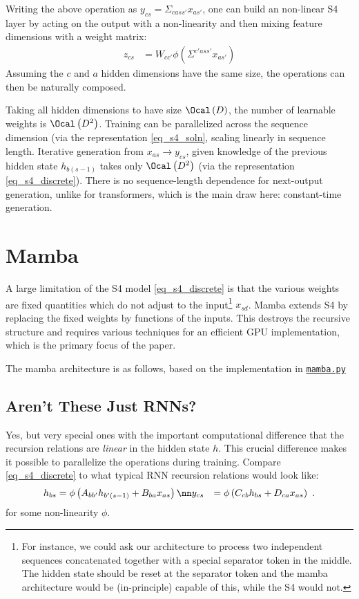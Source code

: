 Writing the above operation as $ y _{cs }   = \Sigma _{ca s s' } x _{ as' } $, one can build an
non-linear S4 layer by acting on the output with a non-linearity and then mixing feature dimensions
with a weight matrix:
\begin{align}
     z  _{ cs }  &= W _{ c c' } \phi \left ( \Sigma ^{c'a s s' } x _{ as' } \right ) \label{eq_s4_layer}
\end{align}
Assuming the $ c  $ and $ a  $ hidden dimensions have the same size, the operations can then be
naturally composed.

Taking all hidden dimensions to have size $ \Ocal \left( D \right)  $, the number of learnable
weights is $ \Ocal \left( D ^{ 2 }  \right)  $. Training can be parallelized across the sequence
dimension (via the representation \eqref{eq_s4_soln}, scaling linearly in sequence length. Iterative
generation from $ x _{ as } \longrightarrow y _{ cs }  $, given knowledge of the previous hidden
state $ h _{ b (s-1) }  $ takes only $ \Ocal \left( D ^{ 2 } \right)  $ (via the representation
\eqref{eq_s4_discrete}). There is no sequence-length dependence for next-output generation, unlike
for transformers, which is the main draw here: constant-time generation.

\section{Mamba\label{sec_mamba}}

A large limitation of the S4 model \eqref{eq_s4_discrete} is that the various weights are fixed
quantities which do not adjust to the input\footnote{For instance, we could ask our architecture to
    process two independent sequences concatenated together with a special separator token in the
    middle. The hidden state should be reset at the separator token and the mamba architecture would
be (in-principle) capable of this, while the S4 would not.} $ x _{ sd }  $. Mamba \cite{mamba}
extends S4 by replacing the fixed weights by functions of the inputs. This destroys the recursive
structure and requires various techniques for an efficient GPU implementation, which is the primary
focus of the paper.

The mamba architecture is as follows, based on the implementation in
\href{https://github.com/alxndrTL/mamba.py}{\texttt{mamba.py}}


\subsection{Aren't These Just RNNs?\label{subsec_rnns_and_ssm}}

Yes, but very special ones with the important computational difference that the recursion relations
are \textit{linear} in the hidden state $ h $. This crucial difference makes it possible to
parallelize the operations during training. Compare \eqref{eq_s4_discrete} to what typical RNN
recursion relations would look like:
\begin{align}
    h  _{ bs } &= \phi \left (A  _{ b b' }h _{ b' (s-1) } + B  _{ b a }x  _{ as }\right )\nn
    y  _{ cs } &= \phi\left (C _{ c b }h  _{ bs } + D _{ c a }x  _{ as }\right ) \label{eq_rnn_comparison} \ .
\end{align}
for some non-linearity $ \phi $.
